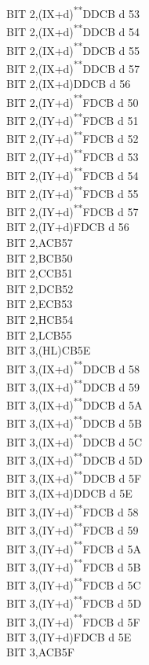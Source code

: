 \documentclass[12pt,twoside,openright,a4paper]{book}
\newcommand{\UNDOC}{\textnormal{\textsuperscript{**}}}
\begin{document}
\begin{multicols}{3}
{\begin{tabbing}
	BIT 2,(IX+d)\UNDOC\>DDCB d 53\\
	BIT 2,(IX+d)\UNDOC\>DDCB d 54\\
	BIT 2,(IX+d)\UNDOC\>DDCB d 55\\
	BIT 2,(IX+d)\UNDOC\>DDCB d 57\\
	BIT 2,(IX+d)\>DDCB d 56\\
	BIT 2,(IY+d)\UNDOC\>FDCB d 50\\
	BIT 2,(IY+d)\UNDOC\>FDCB d 51\\
	BIT 2,(IY+d)\UNDOC\>FDCB d 52\\
	BIT 2,(IY+d)\UNDOC\>FDCB d 53\\
	BIT 2,(IY+d)\UNDOC\>FDCB d 54\\
	BIT 2,(IY+d)\UNDOC\>FDCB d 55\\
	BIT 2,(IY+d)\UNDOC\>FDCB d 57\\
	BIT 2,(IY+d)\>FDCB d 56\\
	BIT 2,A\>CB57\\
	BIT 2,B\>CB50\\
	BIT 2,C\>CB51\\
	BIT 2,D\>CB52\\
	BIT 2,E\>CB53\\
	BIT 2,H\>CB54\\
	BIT 2,L\>CB55\\
	BIT 3,(HL)\>CB5E\\
	BIT 3,(IX+d)\UNDOC\>DDCB d 58\\
	BIT 3,(IX+d)\UNDOC\>DDCB d 59\\
	BIT 3,(IX+d)\UNDOC\>DDCB d 5A\\
	BIT 3,(IX+d)\UNDOC\>DDCB d 5B\\
	BIT 3,(IX+d)\UNDOC\>DDCB d 5C\\
	BIT 3,(IX+d)\UNDOC\>DDCB d 5D\\
	BIT 3,(IX+d)\UNDOC\>DDCB d 5F\\
	BIT 3,(IX+d)\>DDCB d 5E\\
	BIT 3,(IY+d)\UNDOC\>FDCB d 58\\
	BIT 3,(IY+d)\UNDOC\>FDCB d 59\\
	BIT 3,(IY+d)\UNDOC\>FDCB d 5A\\
	BIT 3,(IY+d)\UNDOC\>FDCB d 5B\\
	BIT 3,(IY+d)\UNDOC\>FDCB d 5C\\
	BIT 3,(IY+d)\UNDOC\>FDCB d 5D\\
	BIT 3,(IY+d)\UNDOC\>FDCB d 5F\\
	BIT 3,(IY+d)\>FDCB d 5E\\
	BIT 3,A\>CB5F\\

\end{tabbing}}
\end{multicols}
\end{document}
